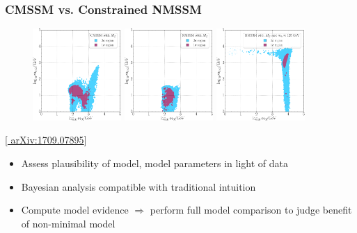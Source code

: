\documentclass[10pt,aspectratio=169]{beamer}
\begin{document}
\begin{frame}
  \frametitle{CMSSM vs. Constrained NMSSM}
  \begin{figure}
    \hspace{-5pt}
    \includegraphics[width=0.3\textwidth]{CMSSM_pdf_mz_m0m12}
    \hfill
    \includegraphics[width=0.3\textwidth]{CNMSSM_pdf_mz_m0m12}
    \hfill
    \includegraphics[width=0.3\textwidth]{CNMSSM_pdf_mz_mh_m0m12}
    \hfill
  \end{figure}
  \vspace{-10pt}
  \begin{center}
    { \tiny [\href{http://arxiv.org/abs/1709.07895}{%
          arXiv:1709.07895}] }
  \end{center}
  \begin{itemize} \itemsep1em
  \item Assess plausibility of model, model parameters in light of data
  \item Bayesian analysis compatible with traditional intuition
  \item Compute model evidence $\Rightarrow$ {\color{blue} perform full
    model comparison} to judge benefit of non-minimal model
  \end{itemize}
\end{frame}
\end{document}
